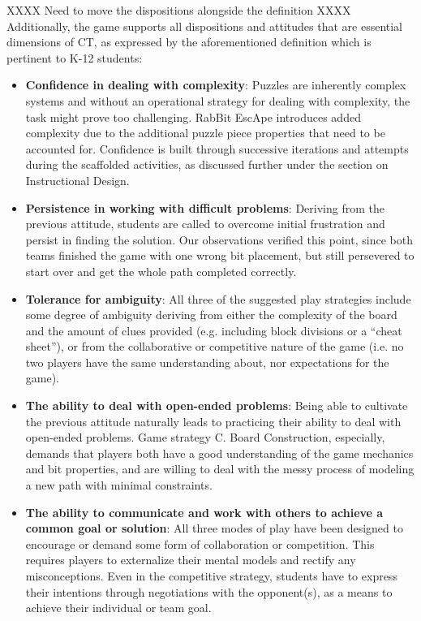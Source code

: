 \documentclass{acm_proc_article-sp}
\begin{document}
XXXX Need to move the dispositions alongside the definition XXXX
Additionally, the game supports all dispositions and attitudes that are essential dimensions of CT, as expressed by the aforementioned definition which is pertinent to K-12 students:
\begin{itemize}
       \item \textbf{Confidence in dealing with complexity\label{itm:1_confidence}}:
       Puzzles are inherently complex systems and without an operational strategy for dealing with complexity, the task might prove too challenging.
       RabBit EscApe introduces added complexity due to the additional puzzle piece properties that need to be accounted for.
       Confidence is built through successive iterations and attempts during the scaffolded activities, as discussed further under the section on Instructional Design.
       \item \textbf{Persistence in working with difficult problems\label{itm:2_persistence}}:
       Deriving from the previous attitude, students are called to overcome initial frustration and persist in finding the solution. Our observations verified this point, since both teams finished the game with one wrong bit placement, but still persevered to start over and get the whole path completed correctly.
       \item \textbf{Tolerance for ambiguity\label{itm:3_tolerance}}: 
       All three of the suggested play strategies include some degree of ambiguity deriving from either the complexity of the board and the amount of clues provided (e.g. including block divisions or a ``cheat sheet''), or from the collaborative or competitive nature of the game (i.e. no two  players have the same understanding about, nor expectations for the game). 
       \item \textbf{The ability to deal with open-ended problems\label{itm:4_open_ended}}:
       Being able to cultivate the previous attitude naturally leads to practicing their ability to deal with open-ended problems. Game strategy C. Board Construction, especially, demands that players both have a good understanding of the game mechanics and bit properties, and are willing to deal with the messy process of modeling a new path with minimal constraints.
       \item \textbf{The ability to communicate and work with others to achieve a common goal or solution\label{itm:5_communicate}}:
       All three modes of play have been designed to encourage or demand some form of collaboration or competition.
       This requires players to externalize their mental models and rectify any misconceptions.
       Even in the competitive strategy, students have to express their intentions through negotiations with the opponent(s), as a means to achieve their individual or team goal.
\end{itemize}
\end{document}
